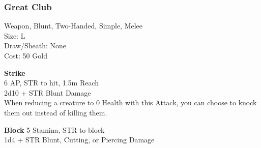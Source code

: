\subsubsection{Great Club}\label{weapon:greatClub}
Weapon, Blunt, Two-Handed, Simple, Melee\\
Size: L\\
Draw/Sheath: None\\
Cost: 50 Gold

\textbf{Strike} \\
6 AP, STR to hit, 1.5m Reach\\
2d10 + \texttimes STR Blunt Damage\\
When reducing a creature to 0 Health with this Attack, you can choose to knock them out instead of killing them.

\textbf{Block}
5 Stamina, STR to block\\
1d4 + \texttimes STR Blunt, Cutting, or Piercing Damage

